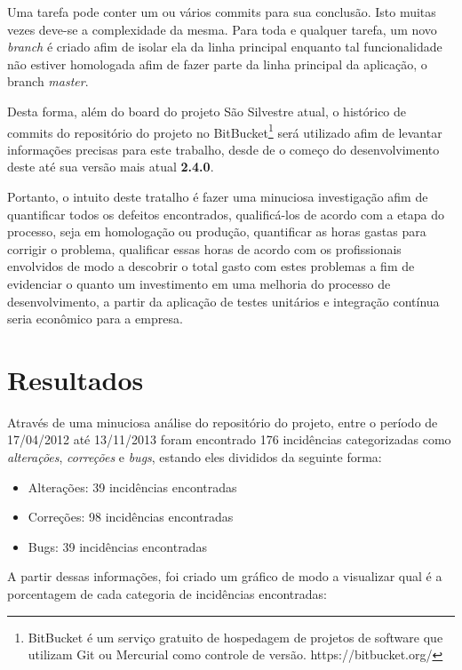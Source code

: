 \documentclass[11pt, a4paper]{article}
\begin{document}
Uma tarefa pode conter um ou vários commits para sua conclusão. Isto muitas vezes deve-se a complexidade da mesma. Para toda e qualquer tarefa, um novo \textit{branch} é criado afim de isolar ela da linha principal enquanto tal funcionalidade não estiver homologada afim de fazer parte da linha principal da aplicação, o branch \textit{master}.

Desta forma, além do board do projeto São Silvestre atual, o histórico de commits do repositório do projeto no BitBucket\footnote{BitBucket é um serviço gratuito de hospedagem de projetos de software que utilizam Git ou Mercurial como controle de versão. https://bitbucket.org/} será utilizado afim de levantar informações precisas para este trabalho, desde de o começo do desenvolvimento deste até sua versão mais atual \textbf{2.4.0}.

Portanto, o intuito deste tratalho é fazer uma minuciosa investigação afim de quantificar todos os defeitos encontrados, qualificá-los de acordo com a etapa do processo, seja em homologação ou produção, quantificar as horas gastas para corrigir o problema, qualificar essas horas de acordo com os profissionais envolvidos de modo a descobrir o total gasto com estes problemas a fim de evidenciar o quanto um investimento em uma melhoria do processo de desenvolvimento, a partir da aplicação de testes unitários e integração contínua seria econômico para a empresa.

\section{Resultados}
Através de uma minuciosa análise do repositório do projeto, entre o período de 17/04/2012 até 13/11/2013 foram encontrado 176 incidências categorizadas como \textit{alterações}, \textit{correções} e \textit{bugs}, estando eles divididos da seguinte forma:

\begin{itemize}
	\item Alterações: 39 incidências encontradas
	\item Correções: 98 incidências encontradas
	\item Bugs: 39 incidências encontradas
\end{itemize}

A partir dessas informações, foi criado um gráfico de modo a visualizar qual é a porcentagem de cada categoria de incidências encontradas:
\end{document}
